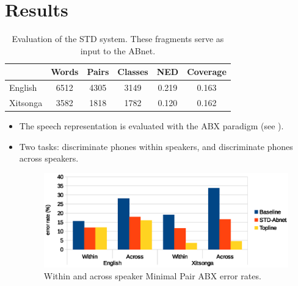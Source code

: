 \documentclass[final]{beamer}
\newcommand{\abnet}{{\sc ABnet}}
\begin{document}
\begin{frame}[t]
\begin{multicols}{2}
\begin{itemize}
\end{itemize}






\section{Results}

\begin{table}[h]
\caption{\label{tab:std-stats} Evaluation of the STD system. These fragments serve as input to the \abnet{}.}
\small
\begin{tabular}{lccccc}
\hline
         & Words & Pairs & Classes & NED   & Coverage \\
\hline
English & 6512 & 4305 & 3149 & 0.219 & 0.163 \\
\hline
Xitsonga & 3582 & 1818 & 1782 & 0.120 & 0.162 \\
\hline
\end{tabular}
\end{table}
\vspace{1cm}

\begin{itemize}
\item The speech representation is evaluated with the ABX paradigm (see \cite{versteeghetal2015}).
\item Two tasks: discriminate phones within speakers, and discriminate phones across speakers.

\begin{figure}[ht!]
  \begin{center}
    \includegraphics[width=0.8\columnwidth]{results}
    \caption{\label{fig:system}Within and across speaker Minimal Pair ABX error rates.}
  \end{center}
\end{figure}


\end{itemize}
\end{multicols}
\end{frame}
\end{document}
